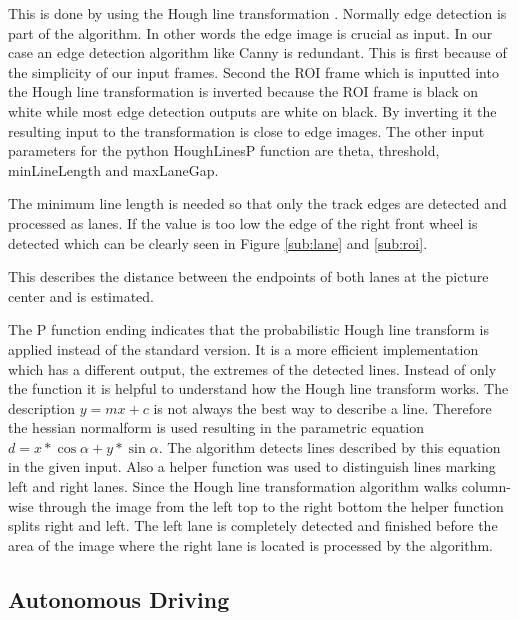 \documentclass[conference]{IEEEtran}
\begin{document}
This is done by using the Hough line transformation \cite{Hough1962}.
Normally edge detection is part of the algorithm.
In other words the edge image is crucial as input.
In our case an edge detection algorithm like Canny is redundant.
This is first because of the simplicity of our input frames.
Second the ROI frame which is inputted into the Hough line transformation is inverted because the ROI frame is black on white while most edge detection outputs are white on black.
By inverting it the resulting input to the transformation is close to edge images.
The other input parameters for the python HoughLinesP function are theta, threshold, minLineLength and maxLaneGap.
\begin{description}
	\setlength\itemsep{.25em}
	\item[minLineLength] The minimum line length is needed so that only the track edges are detected and processed as lanes. If the value is too low the edge of the right front wheel is detected which can be clearly seen in Figure \ref{sub:lane} and \ref{sub:roi}. 
	\item[maxLineGap] This describes the distance between the endpoints of both lanes at the picture center and is estimated.
\end{description}

The P function ending indicates that the probabilistic Hough line transform is applied instead of the standard version.
It is a more efficient implementation which has a different output, the extremes of the detected lines.
Instead of only the function it is helpful to understand how the Hough line transform works.
The description $y = mx + c$ is not always the best way to describe a line.
Therefore the hessian normalform is used resulting in the parametric equation $d = x * \cos \alpha + y * \sin \alpha$.
The algorithm detects lines described by this equation in the given input.
Also a helper function was used to distinguish lines marking left and right lanes.
Since the Hough line transformation algorithm walks column-wise through the image from the left top to the right bottom the helper function splits right and left.
The left lane is completely detected and finished before the area of the image where the right lane is located is processed by the algorithm.

\subsection{Autonomous Driving}
\end{document}
